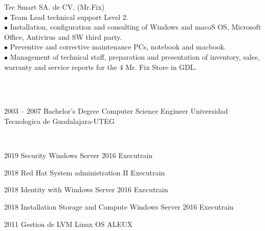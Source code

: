 \documentclass[9pt]{developercv} %
\begin{document}
\begin{entrylist}
	{Tec Smart SA. de CV. (Mr.Fix)}
	{{}\\$\bullet$ Team Lead technical support Level 2.
		\\$\bullet$ Installation, configuration and consulting of Windows and macoS OS, Microsoft Office, Antivirus and SW third party.
		\\$\bullet$ Preventive and corrective maintenance PCs, notebook and macbook.
		\\$\bullet$ Management of technical staff, preparation and presentation of inventory, sales, warranty and service reports for the 4 Mr. Fix Store in GDL. \\ \\}
\end{entrylist}


\\

\begin{entrylist}
	\entry
		{2003 -- 2007}
		{Bachelor's Degree}
		{Computer Science Engineer}
		{Universidad Tecnologica de Guadalajara-UTEG}
\end{entrylist}

\\

\begin{entrylist}
	\entry
		{2019}
		{Security Windows Server 2016}
		{Executrain}
		{}
\end{entrylist}

\begin{entrylist}
	\entry
	{2018}
	{Red Hat System administration II}
	{Executrain}
	{}
\end{entrylist}

\begin{entrylist}
	\entry
	{2018}
	{Identity with Windows Server 2016}
	{Executrain}
	{}
\end{entrylist}


\begin{entrylist}
	\entry
	{2018}
	{Installation Storage and Compute Windows Server 2016}
	{Executrain}
	{}
\end{entrylist}

\begin{entrylist}
	\entry
	{2011}
	{Gestion de LVM Linux OS}
	{ALEUX}
	{}
\end{entrylist}
\end{document}
